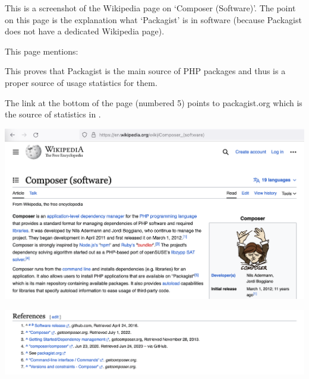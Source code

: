 
This is a screenshot of the Wikipedia page on `Composer (Software)'.
The point on this page is the explanation what `Packagist' is in software
(because Packagist does not have a dedicated Wikipedia page).

This page mentions:


This proves that Packagist is the main source of PHP packages
and thus is a proper source of usage statistics for them.

The link at the bottom of the page (numbered 5) points to packagist.org
which is the source of statistics in .

\includegraphics[width=\textwidth]{packagist-wikipedia-p1}

\pagebreak

\includegraphics[width=\textwidth]{packagist-wikipedia-bottom}

\pagebreak




